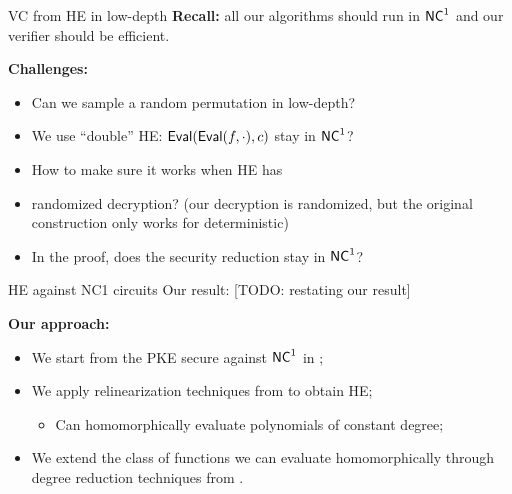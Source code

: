 \begin{frame}{VC from HE in low-depth}
	\textbf{Recall:} all our algorithms should run in ${\mathsf{NC}}^1$ and our verifier should be efficient.
	
	\textbf{Challenges: }
	\begin{itemize}
		\item Can we sample a random permutation in low-depth?
		\item We use ``double'' HE: $\mathsf{Eval}(\mathsf{Eval}(f, \cdot), c)$ stay in ${\mathsf{NC}}^1$?
		\item How to make sure it works when HE has \item{randomized} decryption? (our decryption is randomized, but the original construction only works for deterministic)
		\item In the proof, does the security reduction stay in ${\mathsf{NC}}^1$?
	\end{itemize}
\end{frame}

\begin{frame}{HE against NC1 circuits}
	Our result: [TODO: restating our result]
	
	\textbf{Our approach:}
	\begin{itemize}
		\item We start from the PKE secure against ${\mathsf{NC}}^1$ in \cite{fgcrypto};
		\item We apply relinearization techniques from \cite{fhe-lwe} to obtain HE;
		\begin{itemize}
			\item Can homomorphically evaluate polynomials of constant degree; 
		\end{itemize}
		\item We extend the class of functions we can evaluate homomorphically through degree reduction techniques from \cite{razborov1987lower}.
	\end{itemize}
\end{frame}

